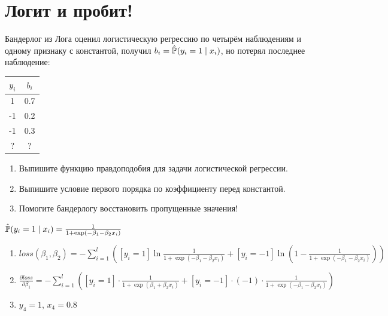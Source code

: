 \section{Логит и пробит!}


\begin{problem}
Бандерлог из Лога оценил логистическую регрессию по четырём наблюдениям и одному признаку с константой, 
получил $b_i = \hat\P(y_i = 1 \mid x_i)$, но потерял последнее наблюдение:

\begin{tabular}{cc}
  \toprule
  $y_i$ & $b_i$ \\
  \midrule
  1 & 0.7 \\
  -1 & 0.2 \\
  -1 & 0.3 \\
  ? &  ? \\
  \bottomrule
\end{tabular}

\begin{enumerate}
\item Выпишите функцию правдоподобия для задачи логистической регрессии.
\item Выпишите условие первого порядка по коэффициенту перед константой.
\item Помогите бандерлогу восстановить пропущенные значения!
\end{enumerate}

\begin{sol}
$\hat\P(y_i = 1 \mid x_i) = \frac{1}{1+\exp(-\beta_1 - \beta_2 x_i)}$
\begin{enumerate}
\item $loss(\beta_1, \beta_2) = - \sum_{i=1}^l \left([y_i = 1] \ln  \frac{1}{1+\exp(-\beta_1 - \beta_2 x_i)} + [y_i = -1] \ln \left(1 - \frac{1}{1+\exp(-\beta_1 - \beta_2 x_i)}\right)\right)$
\item $\frac{\partial loss}{\partial \beta_1} = - \sum_{i=1}^l \left([y_i = 1] \cdot \frac{1}{1 + \exp(\beta_1 + \beta_2 x_i)} + [y_i = -1] \cdot (-1) \cdot \frac{1}{1 + \exp(-\beta_1 - \beta_2 x_i)} \right)$
\item $y_4 = 1$, $x_4 = 0.8$
\end{enumerate}
\end{sol}
\end{problem}


